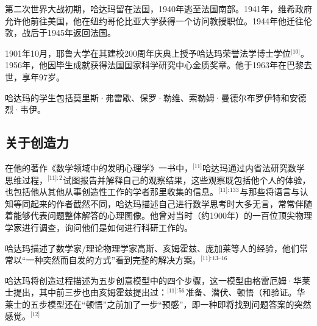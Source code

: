 第二次世界大战初期，哈达玛留在法国，1940年逃至法国南部。1941年，维希政府允许他前往美国，他在纽约哥伦比亚大学获得一个访问教授职位。1944年他迁往伦敦，战后于1945年返回法国。

1901年10月，耶鲁大学在其建校200周年庆典上授予哈达玛荣誉法学博士学位\(^\text{[10]}\)。1956年，他因毕生成就获得法国国家科学研究中心金质奖章。他于1963年在巴黎去世，享年97岁。

哈达玛的学生包括莫里斯·弗雷歇、保罗·勒维、索勒姆·曼德尔布罗伊特和安德烈·韦伊。
\subsection{关于创造力}
在他的著作《数学领域中的发明心理学》一书中，\(^\text{[11]}\)哈达玛通过内省法研究数学思维过程，\(^\text{[11]: 2 }\)试图报告并解释自己的观察结果，这些观察既包括他个人的体验，也包括他从其他从事创造性工作的学者那里收集的信息。\(^\text{[11]: 133 }\)与那些将语言与认知等同起来的作者截然不同，哈达玛描述自己进行数学思考时大多无言，常常伴随着能够代表问题整体解答的心理图像。他曾对当时（约1900年）的一百位顶尖物理学家进行调查，询问他们是如何进行科研工作的。

哈达玛描述了数学家/理论物理学家高斯、亥姆霍兹、庞加莱等人的经验，他们常常以“一种突然而自发的方式”看到完整的解决方案。\(^\text{[11]: 13–16}\) 

哈达玛将创造过程描述为五步创意模型中的四个步骤，这一模型由格雷厄姆·华莱士提出，其中前三步也由亥姆霍兹提出过：\(^\text{[11]: 56}\) 准备、潜伏、顿悟（和验证。华莱士的五步模型还在“顿悟”之前加了一步“预感”，即一种即将找到问题答案的突然感觉。\(^\text{[12]}\)
